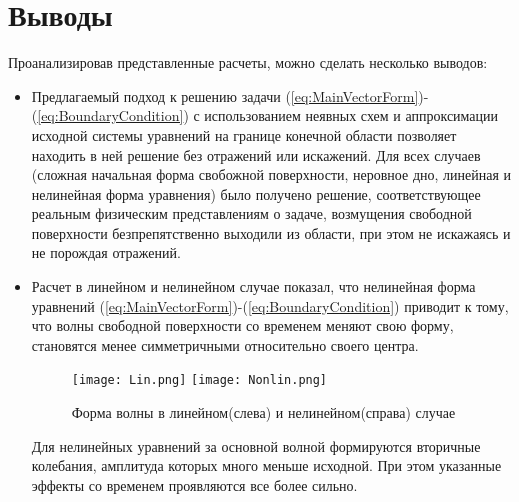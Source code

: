 \newpage
\addtocounter{section}{1}
\setcounter{subsection}{0}
\setcounter{equation}{0}
\section*{Выводы} 

Проанализировав представленные расчеты, можно сделать несколько выводов:
\begin{itemize}
    \item Предлагаемый подход к решению задачи (\ref{eq:MainVectorForm})-(\ref{eq:BoundaryCondition}) с использованием неявных схем и аппроксимации исходной системы уравнений на границе конечной области позволяет находить в ней решение без отражений или искажений. Для всех случаев (сложная начальная форма свобожной поверхности, неровное дно, линейная и нелинейная форма уравнения) было получено решение, соответствующее реальным физическим представлениям о задаче, возмущения свободной поверхности безпрепятственно выходили из области, при этом не искажаясь и не порождая отражений.
    \item Расчет в линейном и нелинейном случае показал, что нелинейная форма уравнений (\ref{eq:MainVectorForm})-(\ref{eq:BoundaryCondition}) приводит к тому, что волны свободной поверхности со временем меняют свою форму, становятся менее симметричными относительно своего центра.
	\begin{figure}[H]
	    \centering
	    \texttt{[image: Lin.png]}
	    \texttt{[image: Nonlin.png]}
	    \caption{Форма волны в линейном(слева) и нелинейном(справа) случае}
	    \label{fig:Lin_Nonlin_Wave}
	\end{figure}
	Для нелинейных уравнений за основной волной формируются вторичные колебания, амплитуда которых много меньше исходной. При этом указанные эффекты со временем проявляются все более сильно.
\end{itemize}
